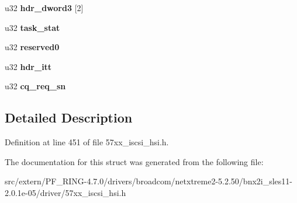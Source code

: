 \begin{DoxyCompactItemize}
\item 
\hypertarget{structbnx2i__fw__response_ae14d99ebf997f6bb5254ab1f6d690ba2}{
u32 {\bfseries hdr\_\-dword3} \mbox{[}2\mbox{]}}
\label{structbnx2i__fw__response_ae14d99ebf997f6bb5254ab1f6d690ba2}

\item 
\hypertarget{structbnx2i__fw__response_a9710b6b227a0af03a6c3948bb86a7c70}{
u32 {\bfseries task\_\-stat}}
\label{structbnx2i__fw__response_a9710b6b227a0af03a6c3948bb86a7c70}

\item 
\hypertarget{structbnx2i__fw__response_a192a7cd128d89603883a7f5b96f41c92}{
u32 {\bfseries reserved0}}
\label{structbnx2i__fw__response_a192a7cd128d89603883a7f5b96f41c92}

\item 
\hypertarget{structbnx2i__fw__response_ad09b155bc8507c99fe98bc37dc218ec4}{
u32 {\bfseries hdr\_\-itt}}
\label{structbnx2i__fw__response_ad09b155bc8507c99fe98bc37dc218ec4}

\item 
\hypertarget{structbnx2i__fw__response_a97336b2b9355c6c8bef90c4396d5c7b6}{
u32 {\bfseries cq\_\-req\_\-sn}}
\label{structbnx2i__fw__response_a97336b2b9355c6c8bef90c4396d5c7b6}

\end{DoxyCompactItemize}


\subsection{Detailed Description}


Definition at line 451 of file 57xx\_\-iscsi\_\-hsi.h.



The documentation for this struct was generated from the following file:\begin{DoxyCompactItemize}
\item 
src/extern/PF\_\-RING-\/4.7.0/drivers/broadcom/netxtreme2-\/5.2.50/bnx2i\_\-sles11-\/2.0.1e-\/05/driver/57xx\_\-iscsi\_\-hsi.h\end{DoxyCompactItemize}
